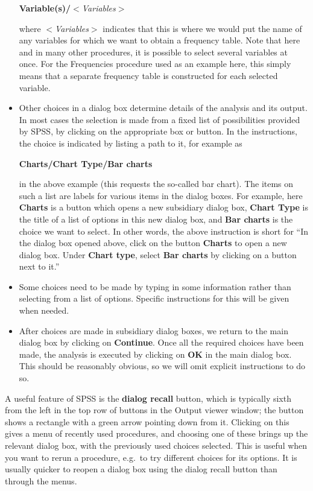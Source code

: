 \documentclass[11pt,a4paper,openany]{book}
\begin{document}
\begin{itemize}
  \textbf{Variable(s)/}\emph{\(<\)Variables\(>\)}

  where \emph{\(<\)Variables\(>\)} indicates that this is where we would
  put the name of any variables for which we want to obtain a frequency
  table. Note that here and in many other procedures, it is possible to
  select several variables at once. For the Frequencies procedure used
  as an example here, this simply means that a separate frequency table
  is constructed for each selected variable.
\item
  Other choices in a dialog box determine details of the analysis and
  its output. In most cases the selection is made from a fixed list of
  possibilities provided by SPSS, by clicking on the appropriate box or
  button. In the instructions, the choice is indicated by listing a path
  to it, for example as

  \textbf{Charts/Chart Type/Bar charts}

  in the above example (this requests the so-called bar chart). The
  items on such a list are labels for various items in the dialog boxes.
  For example, here \textbf{Charts} is a button which opens a new
  subsidiary dialog box, \textbf{Chart Type} is the title of a list of
  options in this new dialog box, and \textbf{Bar charts} is the choice
  we want to select. In other words, the above instruction is short for
  ``In the dialog box opened above, click on the button \textbf{Charts}
  to open a new dialog box. Under \textbf{Chart type}, select
  \textbf{Bar charts} by clicking on a button next to it.''
\item
  Some choices need to be made by typing in some information rather than
  selecting from a list of options. Specific instructions for this will
  be given when needed.
\item
  After choices are made in subsidiary dialog boxes, we return to the
  main dialog box by clicking on \textbf{Continue}. Once all the
  required choices have been made, the analysis is executed by clicking
  on \textbf{OK} in the main dialog box. This should be reasonably
  obvious, so we will omit explicit instructions to do so.
\end{itemize}

A useful feature of SPSS is the \textbf{dialog recall} button, which is
typically sixth from the left in the top row of buttons in the Output
viewer window; the button shows a rectangle with a green arrow pointing
down from it. Clicking on this gives a menu of recently used procedures,
and choosing one of these brings up the relevant dialog box, with the
previously used choices selected. This is useful when you want to rerun
a procedure, e.g.~to try different choices for its options. It is
usually quicker to reopen a dialog box using the dialog recall button
than through the menus.
\end{document}
